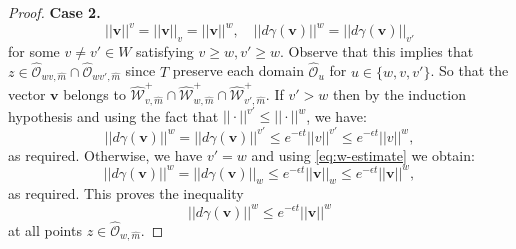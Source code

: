 \documentclass[10pt,a4paper]{amsart}
\def\ba{\mathbf{a}}
\def\bv{\mathbf{v}}
\def\cO{{\mathscr{O}}}
\def\cW{{\mathscr{W}}}
\def\eps{\epsilon}
\def\ga{\gamma}
\begin{document}
\begin{proof}
\medskip 
{\bf Case 2.} 
$$
||\bv||^v= ||\bv||_v= ||\bv||^w, \quad ||d\ga(\bv)||^w= ||d\ga(\bv)||_{v'} 
$$
for some $ v \neq  v'\in W$ satisfying $v\ge w, v'\ge w$.
Observe that this implies that $z \in \hat{\cO}_{wv,\hat{m}}\cap \hat{\cO}_{wv',\hat{m}}$ since $T$ preserve each domain $\hat{\cO}_{u}$ for $u \in \{ w,v,v'\}$. 
So that the vector $\bv$ belongs to $\hat{\cW}_{v,\hat{m}}^+ \cap \hat{\cW}_{w,\hat{m}}^+ \cap \hat{\cW}_{v', \hat{m}}^+$. 
If $v' > w$ then by the induction hypothesis and using the fact that $|| \cdot ||^{v'}\leqslant || \cdot ||^{w}$, we have: 
\begin{equation*}
|| d \gamma(\bv)||^w = || d\gamma (\bv)||^{v'} \leqslant e^{-\epsilon t} || v||^{v'} \leqslant e^{-\epsilon t} || v||^{w},  
\end{equation*}
as required. 
Otherwise, we have $v'=w$ and using \eqref{eq:w-estimate} 
we obtain: 
\begin{equation*}
|| d \gamma(\bv)||^{w} = || d\gamma(\bv) ||_w \leqslant e^{-\epsilon t} || \bv ||_w \leqslant e^{-\epsilon t} || \bv||^w, 
\end{equation*}
as required.   
This proves the inequality 
$$
 ||d\ga (\bv)||^w\leqslant  e^{-\eps t} ||\bv||^w  
$$
at all points $z\in \hat{\cO}_{w,\hat{m}}$. 


\end{proof}
\end{document}
